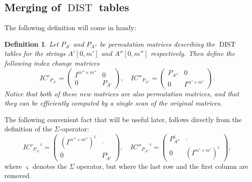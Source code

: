 \documentclass[twoside,11pt,openright]{report}
\newcommand{\DIST}{\operatorname{DIST}}
\newcommand{\str}[3]{#1[#2, #3]}
\newtheorem{mydef}{Definition}
\begin{document}
\subsection{Merging of $\DIST$ tables}
The following definition will come in handy:
\begin{mydef}
  Let $P_{A'}$ and $P_{A''}$ be permutation matrices describing the $\DIST$ tables for the strings $\str{A'}{0}{m'}$ and $\str{A''}{0}{m''}$ respectively. Then define the following index change matrices
  \[
    IC'_{P_{A'}} = \begin{pmatrix}
      I^{m'' \times m''} & 0 \\
      0 & P_{A'}
    \end{pmatrix}, \quad
    IC''_{P_{A''}} = \begin{pmatrix}
      P_{A''} & 0 \\
      0 & I^{m' \times m'}
    \end{pmatrix}.
  \]
  Notice that both of these new matrices are also permutation matrices, and that they can be efficiently computed by a single scan of the original matrices.
\end{mydef}

The following convenient fact that will be useful later, follows directly from the definition of the $\Sigma$-operator:
\[
  {IC'_{P_{A'}}}^{\varsigma} = \begin{pmatrix}
    (I^{m'' \times m''})^{\varsigma} & \cdot \\
    0 & P_{A'}^{\varsigma}
  \end{pmatrix}, \quad
  {IC''_{P_{A''}}}^{\varsigma} = \begin{pmatrix}
    P_{A''}^{\varsigma} & \cdot \\
    0 & (I^{m' \times m'})^{\varsigma}
  \end{pmatrix},
\]
where $\varsigma$ denotes the $\Sigma$ operator, but where the last row and the first column are removed.
\end{document}

